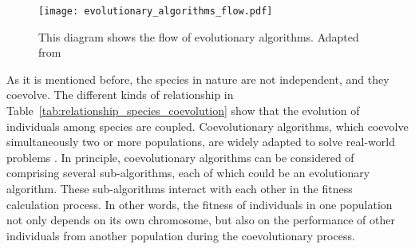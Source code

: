 \begin{figure}[htbp]
  \centering
  \texttt{[image: evolutionary\_algorithms\_flow.pdf]}
  \caption{This diagram shows the flow of evolutionary algorithms. Adapted from \cite{Eiben:Nature:2015}}
  \label{fig:evolutionary_algorithms_flow}
\end{figure}

As it is mentioned before, the species in nature are not independent, and they coevolve. The different kinds of relationship in Table~\ref{tab:relationship_species_coevolution} show that the evolution of individuals among species are coupled. Coevolutionary algorithms, which coevolve simultaneously two or more populations, are widely adapted to solve real-world problems \cite{Rosin_1997, Bongard2005, Zhou2006, tan2006coevolutionary}. In principle, coevolutionary algorithms can be considered of comprising several sub-algorithms, each of which could be an evolutionary algorithm. These sub-algorithms interact with each other in the fitness calculation process. In other words, the fitness of individuals in one population not only depends on its own chromosome, but also on the performance of other individuals from another population during the coevolutionary process. 


